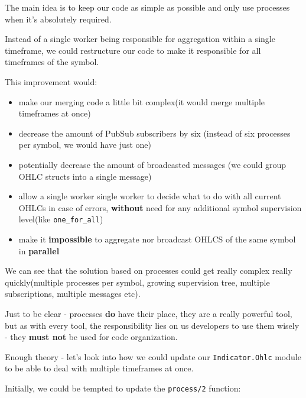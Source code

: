 \documentclass[
  oneside]{book}
\providecommand{\tightlist}{%
  \setlength{\itemsep}{0pt}\setlength{\parskip}{0pt}}
\begin{document}
The main idea is to keep our code as simple as possible and only use processes when it's absolutely required.

\newpage

Instead of a single worker being responsible for aggregation within a single timeframe, we could restructure our code to make it responsible for all timeframes of the symbol.

This improvement would:

\begin{itemize}
\tightlist
\item
  make our merging code a little bit complex(it would merge multiple timeframes at once)
\item
  decrease the amount of PubSub subscribers by six (instead of six processes per symbol, we would have just one)
\item
  potentially decrease the amount of broadcasted messages (we could group OHLC structs into a single message)
\item
  allow a single worker single worker to decide what to do with all current OHLCs in case of errors, \textbf{without} need for any additional symbol supervision level(like \texttt{one\_for\_all})
\item
  make it \textbf{impossible} to aggregate nor broadcast OHLCS of the same symbol in \textbf{parallel}
\end{itemize}

We can see that the solution based on processes could get really complex really quickly(multiple processes per symbol, growing supervision tree, multiple subscriptions, multiple messages etc).

Just to be clear - processes \textbf{do} have their place, they are a really powerful tool, but as with every tool, the responsibility lies on us developers to use them wisely - they \textbf{must not} be used for code organization.

Enough theory - let's look into how we could update our \texttt{Indicator.Ohlc} module to be able to deal with multiple timeframes at once.

Initially, we could be tempted to update the \texttt{process/2} function:
\end{document}
